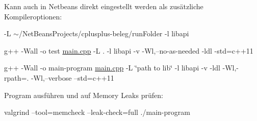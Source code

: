 Kann auch in Netbeans direkt eingestellt werden als zusätzliche Kompileroptionen\-:
\begin{DoxyItemize}
\item -\/\-L $\sim$/\-Net\-Beans\-Projects/cplusplus-\/beleg/run\-Folder -\/l libapi
\item g++ -\/\-Wall -\/o test \hyperlink{main_8cpp}{main.\-cpp} -\/\-L . -\/l libapi -\/v -\/\-Wl,--no-\/as-\/needed -\/ldl -\/std=c++11
\item g++ -\/\-Wall -\/o main-\/program \hyperlink{main_8cpp}{main.\-cpp} -\/\-L \char`\"{}path to lib\char`\"{} -\/l libapi -\/v -\/ldl -\/\-Wl,-\/rpath=. -\/\-Wl,--verbose --std=c++11
\end{DoxyItemize}

Program ausführen und auf Memory Leaks prüfen\-:
\begin{DoxyItemize}
\item valgrind --tool=memcheck --leak-\/check=full ./main-\/program 
\end{DoxyItemize}